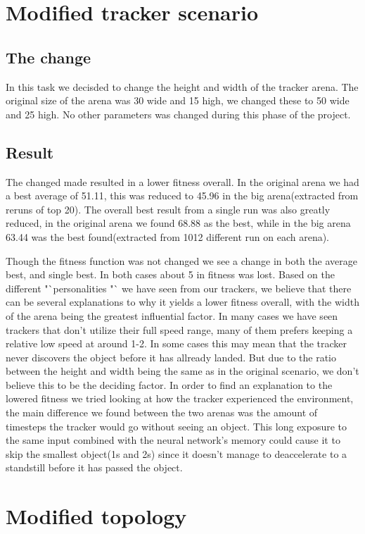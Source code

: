 \documentclass[12pt]{article}
\begin{document}
\section{Modified tracker scenario}
	\subsection{The change}
		In this task we decisded to change the height and width of the tracker arena. The original size of the arena was 30 wide and 15 high, we changed these to 50 wide and 25 high. No other parameters was changed during this phase of the project. 
	\subsection{Result}
		The changed made resulted in a lower fitness overall. In the original arena we had a best average of 51.11, this was reduced to 45.96 in the big arena(extracted from reruns of top 20). The overall best result from a single run was also greatly reduced, in the original arena we found 68.88 as the best, while in the big arena 63.44 was the best found(extracted from 1012 different run on each arena). 
		
		Though the fitness function was not changed we see a change in both the average best, and single best. In both cases about 5 in fitness was lost. Based on the different "`personalities "` we have seen from our trackers, we believe that there can be several explanations to why it yields a lower fitness overall, with the width of the arena being the greatest influential factor. In many cases we have seen trackers that don't utilize their full speed range, many of them prefers keeping a relative low speed at around 1-2. In some cases this may mean that the tracker never discovers the object before it has allready landed. But due to the ratio between the height and width being the same as in the original scenario, we don't believe this to be the deciding factor. In order to find an explanation to the lowered fitness we tried looking at how the tracker experienced the environment, the main difference we found between the two arenas was the amount of timesteps the tracker would go without seeing an object. This long exposure to the same input combined with the neural network's memory could cause it to skip the smallest object(1s and 2s) since it doesn't manage to deaccelerate to a standstill before it has passed the object. 
		
\section{Modified topology}
\end{document}
